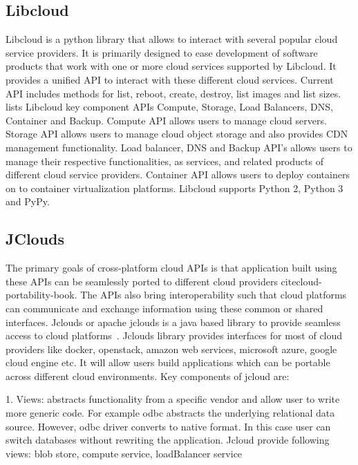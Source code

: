 {     \pv
     
\subsection{Libcloud}

     \cite{www-libcloudwiki} Libcloud is a python library that
     allows to interact with several popular cloud service
     providers. It is primarily designed to ease development of
     software products that work with one or more cloud services
     supported by Libcloud. It provides a unified API to interact with
     these different cloud services. Current API includes methods for
     list, reboot, create, destroy, list images and list
     sizes. \cite{www-libclouddoc} lists Libcloud key component APIs
     Compute, Storage, Load Balancers, DNS, Container and
     Backup. Compute API allows users to manage cloud servers. Storage
     API allows users to manage cloud object storage and also provides
     CDN management functionality. Load balancer, DNS and Backup API’s
     allows users to manage their respective functionalities, as
     services, and related products of different cloud service
     providers. Container API allows users to deploy containers on to
     container virtualization platforms. Libcloud supports Python 2,
     Python 3 and PyPy.

     \pv
     
\subsection{JClouds}

The primary goals of cross-platform cloud APIs is that application
built using these APIs can be seamlessly ported to different cloud
providers cite{cloud-portability-book}.  The APIs also bring
interoperability such that cloud platforms can communicate and
exchange information using these common or shared interfaces.  Jclouds
or apache jclouds is a java based library to provide seamless access
to cloud platforms~\cite{www-jclouds}.  Jclouds library provides
interfaces for most of cloud providers like docker, openstack, amazon
web services, microsoft azure, google cloud engine etc. It will allow
users build applications which can be portable across different cloud
environments.  Key components of jcloud are:

     1. Views: abstracts functionality from a specific vendor and
        allow user to write more generic code. For example odbc
        abstracts the underlying relational data source. However, odbc
        driver converts to native format. In this case user can switch
        databases without rewriting the application. Jcloud provide
        following views: blob store, compute service, loadBalancer
        service

}
